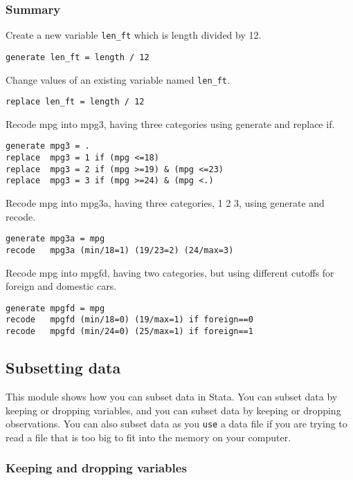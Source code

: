 \subsubsection{Summary}
\begin{compactitem}
\item Create a new variable \lstinline{len_ft} which is length divided by 12.
\begin{lstlisting}
generate len_ft = length / 12
\end{lstlisting}
\item Change values of an existing variable named \lstinline{len_ft}.
\begin{lstlisting}
replace len_ft = length / 12
\end{lstlisting}
\item Recode mpg into mpg3, having three categories using generate and replace if.
\begin{lstlisting}
generate mpg3 = .
replace  mpg3 = 1 if (mpg <=18)
replace  mpg3 = 2 if (mpg >=19) & (mpg <=23)
replace  mpg3 = 3 if (mpg >=24) & (mpg <.)
\end{lstlisting}
\item Recode mpg into mpg3a, having three categories, 1 2 3, using generate and recode.
\begin{lstlisting}
generate mpg3a = mpg
recode   mpg3a (min/18=1) (19/23=2) (24/max=3)
\end{lstlisting}
\item Recode mpg into mpgfd, having two categories, but using different cutoffs for foreign and domestic cars.
\begin{lstlisting}
generate mpgfd = mpg
recode   mpgfd (min/18=0) (19/max=1) if foreign==0
recode   mpgfd (min/24=0) (25/max=1) if foreign==1
\end{lstlisting}
\end{compactitem}

\subsection{Subsetting data}

This module shows how you can subset data in Stata. You can subset data by keeping or dropping variables, and you can subset data by keeping or dropping observations. You can also subset data as you \lstinline{use} a data file if you are trying to read a file that is too big to fit into the memory on your computer.

\subsubsection{Keeping and dropping variables}

